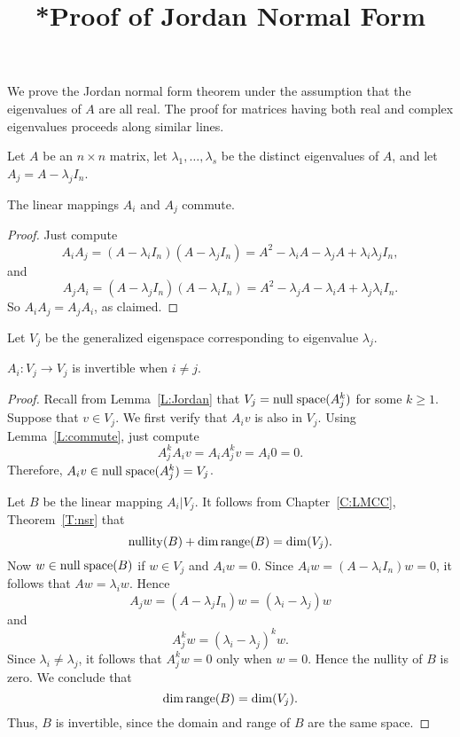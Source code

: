 \documentclass{ximera}
\title{*Proof of Jordan Normal Form}
\begin{document}
\begin{abstract}
\end{abstract}
\maketitle


\label{S:Jordan} 

We prove the Jordan normal form theorem under the assumption that the 
eigenvalues of $A$ are all real.  The proof for matrices having both real and 
complex eigenvalues proceeds along similar lines.

Let $A$ be an $n\times n$ matrix, let $\lambda_1,\ldots,\lambda_s$ be the
distinct eigenvalues of $A$, and let $A_j = A-\lambda_jI_n$.

\begin{lemma}  \label{L:commute}
The linear mappings $A_i$ and $A_j$ commute.
\end{lemma}

\begin{proof} Just compute
\[
A_iA_j = (A-\lambda_iI_n)(A-\lambda_jI_n)= A^2-\lambda_iA-\lambda_jA+
\lambda_i\lambda_jI_n,
\]
and
\[
A_jA_i = (A-\lambda_jI_n)(A-\lambda_iI_n)= A^2-\lambda_jA-\lambda_iA+
\lambda_j\lambda_iI_n.
\]
So $A_iA_j=A_jA_i$, as claimed.  \end{proof}

Let $V_j$ be the generalized eigenspace corresponding to eigenvalue 
$\lambda_j$. 

\begin{lemma}  \label{L:Ajinvertible}
$A_i:V_j\to V_j$ is invertible when $i\neq j$.
\end{lemma}

\begin{proof}  Recall from Lemma~\ref{L:Jordan} that $V_j={\rm null\;space}(A_j^k)$ for some 
$k\ge 1$.  Suppose that $v\in V_j$.  We first verify that $A_iv$ is also in 
$V_j$.  Using Lemma~\ref{L:commute}, just compute 
\[
A_j^kA_iv = A_iA_j^kv = A_i0 = 0.
\]
Therefore, $A_iv\in{\rm null\;space}(A_j^k)=V_j$.
 
Let $B$ be the linear mapping $A_i|V_j$.  It follows from
Chapter~\ref{C:LMCC}, Theorem~\ref{T:nsr} that
\[
{\rm nullity}(B) +\dim{\rm range}(B) = \dim(V_j).
\]
Now $w\in{\rm null\;space}(B)$ if $w\in V_j$ and $A_iw=0$.  Since
$A_iw = (A-\lambda_iI_n)w = 0$, it follows that $Aw = \lambda_iw$.  Hence 
\[
A_jw = (A-\lambda_jI_n)w = (\lambda_i-\lambda_j)w
\]
and
\[
A_j^kw = (\lambda_i-\lambda_j)^kw.
\]
Since $\lambda_i\neq\lambda_j$, it follows that $A_j^kw=0$ only when $w=0$.
Hence the nullity of $B$ is zero.  We conclude that
\[
\dim{\rm range}(B) = \dim(V_j).
\]
Thus, $B$ is invertible, since the domain and range of $B$ are the same
space.  \end{proof}
\end{document}
